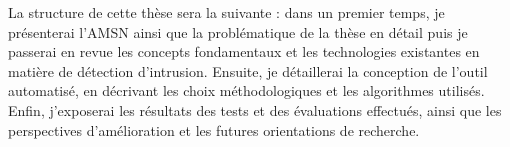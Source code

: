 \newpage

La structure de cette thèse sera la suivante : dans un premier temps, je présenterai l'AMSN ainsi que la problématique de la thèse en détail puis je passerai en revue les concepts fondamentaux et les technologies existantes en matière de détection d'intrusion. Ensuite, je détaillerai la conception de l'outil automatisé, en décrivant les choix méthodologiques et les algorithmes utilisés. Enfin, j'exposerai les résultats des tests et des évaluations effectués, ainsi que les perspectives d'amélioration et les futures orientations de recherche.



